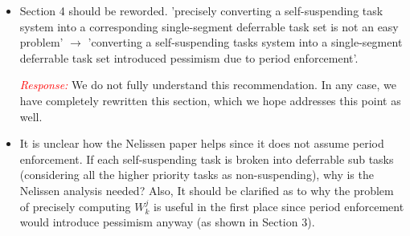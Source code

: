 \documentclass[12pt]{article}
\newenvironment{response}[0]{\textcolor{red}{\emph{Response: }}\color{blue}}{\medskip}
\newcommand{\action}[1]{\textcolor{red}{\emph{\it Actions taken: }}{\color{blue}#1}\medskip}
\begin{document}
\begin{itemize}
\begin{response}
\end{response}

\action{Section 2 was rewritten and expanded to clearly distinguish between the runtime rule (Section 2.2) and the classic analysis (Section 2.3). The runtime rule --- Equation (1) --- is stated in terms of multi-segmented deferrable tasks. }

\action{Section 4 was completely rewritten to more clearly explain that the problem of finding a suitable corresponding task set is open, and likely difficult.}


	\item 
Section 4 should be reworded. 'precisely converting a self-suspending task
system into a corresponding single-segment deferrable task set is not an
easy problem'  $\rightarrow$  'converting a self-suspending tasks system into a
single-segment deferrable task set introduced pessimism due to period
enforcement'. 

\begin{response}
We do not fully understand this recommendation. In any case, we have completely rewritten this section, which we hope addresses this point as well.
\end{response}

\item 
It is unclear how the Nelissen paper helps since it does not
assume period enforcement. If each self-suspending task is broken into
deferrable sub tasks (considering all the higher priority tasks as
non-suspending), why is the Nelissen analysis needed? Also, It should be
clarified as to why the problem of precisely computing $W_k^{j}$ is useful in
the first place since period enforcement would introduce pessimism anyway
(as shown in Section 3).




\end{itemize}
\end{document}
